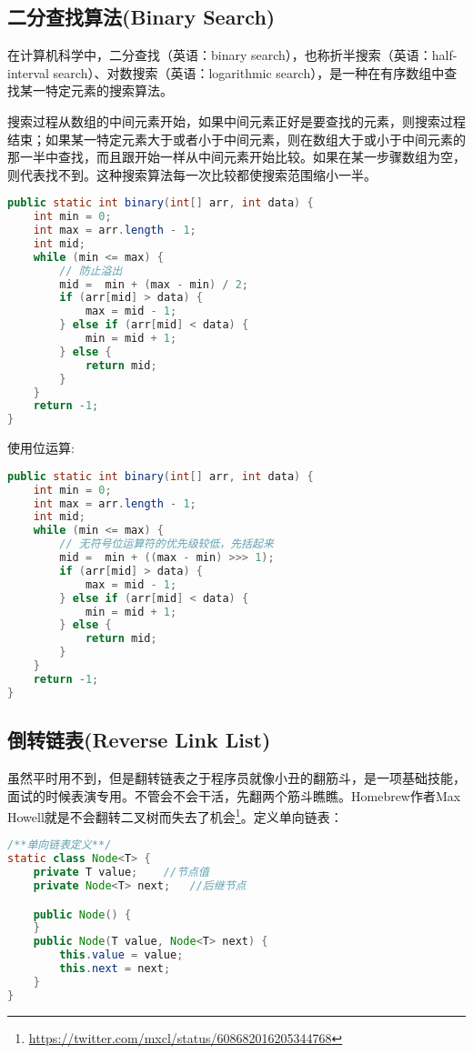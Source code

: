 \documentclass[../../../interview-questions.tex]{subfiles}
\begin{document}
\subsection{二分查找算法(Binary Search)}


在计算机科学中，二分查找（英语：binary search），也称折半搜索（英语：half-interval search）、对数搜索（英语：logarithmic search），是一种在有序数组中查找某一特定元素的搜索算法。

搜索过程从数组的中间元素开始，如果中间元素正好是要查找的元素，则搜索过程结束；如果某一特定元素大于或者小于中间元素，则在数组大于或小于中间元素的那一半中查找，而且跟开始一样从中间元素开始比较。如果在某一步骤数组为空，则代表找不到。这种搜索算法每一次比较都使搜索范围缩小一半。

\begin{lstlisting}[language=Java]
public static int binary(int[] arr, int data) {
    int min = 0;
    int max = arr.length - 1;
    int mid;
    while (min <= max) {
        // 防止溢出
        mid =  min + (max - min) / 2;
        if (arr[mid] > data) {
            max = mid - 1;
        } else if (arr[mid] < data) {
            min = mid + 1;
        } else {
            return mid;
        }
    }
    return -1;
}
\end{lstlisting}

使用位运算:

\begin{lstlisting}[language=Java]
public static int binary(int[] arr, int data) {
    int min = 0;
    int max = arr.length - 1;
    int mid;
    while (min <= max) {
        // 无符号位运算符的优先级较低，先括起来
        mid =  min + ((max - min) >>> 1);
        if (arr[mid] > data) {
            max = mid - 1;
        } else if (arr[mid] < data) {
            min = mid + 1;
        } else {
            return mid;
        }
    }
    return -1;
}
\end{lstlisting}

\subsection{倒转链表(Reverse Link List)}

虽然平时用不到，但是翻转链表之于程序员就像小丑的翻筋斗，是一项基础技能，面试的时候表演专用。不管会不会干活，先翻两个筋斗瞧瞧。Homebrew作者Max Howell就是不会翻转二叉树而失去了机会\footnote{\url{https://twitter.com/mxcl/status/608682016205344768}}。定义单向链表：


\begin{lstlisting}[language=Java]
/**单向链表定义**/
static class Node<T> {
    private T value;    //节点值
    private Node<T> next;   //后继节点

    public Node() {
    }
    public Node(T value, Node<T> next) {
        this.value = value;
        this.next = next;
    }
}
\end{lstlisting}
\end{document}
